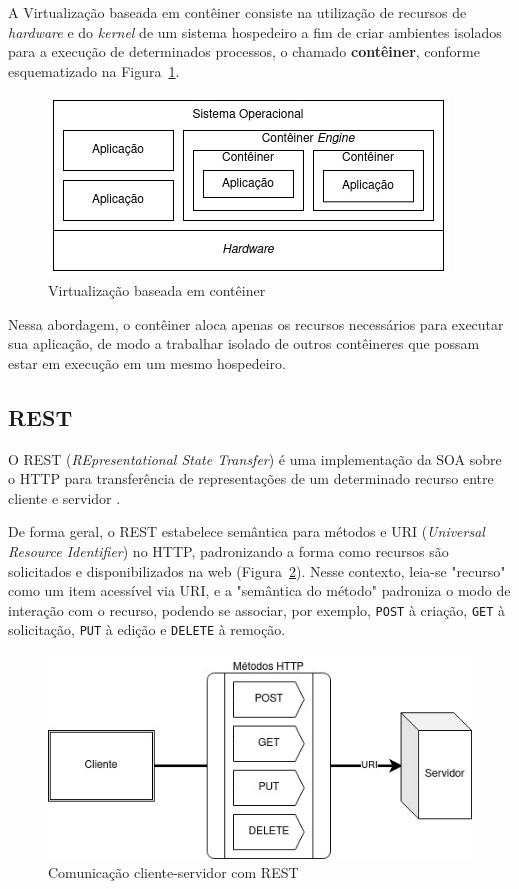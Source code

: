 \documentclass[12pt]{article}
\begin{document}
A Virtualização baseada em contêiner \cite{eder2016} consiste na utilização de recursos de \textit{hardware} e do \textit{kernel} de um sistema hospedeiro a fim de criar ambientes isolados para a execução de determinados processos, o chamado \textbf{contêiner}, conforme esquematizado na Figura~\ref{fig:conteiner}.

\begin{figure}[ht]
	\centering
	\includegraphics[width=.9\textwidth]{conteiner.jpg}
	\caption{Virtualização baseada em contêiner}
	\label{fig:conteiner}
\end{figure} 

Nessa abordagem, o contêiner aloca apenas os recursos necessários para executar sua aplicação, de modo a trabalhar isolado de outros contêineres que possam estar em execução em um mesmo hospedeiro. 

\subsection{REST}

O REST (\textit{REpresentational State Transfer}) é uma implementação da SOA sobre o HTTP para transferência de representações de um determinado recurso entre cliente e servidor \cite{mumbaikar2013}.

De forma geral, o REST estabelece semântica para métodos e URI (\textit{Universal Resource Identifier}) no HTTP, padronizando a forma como recursos são solicitados e disponibilizados na web (Figura~\ref{fig:rest}). Nesse contexto, leia-se "recurso" como um item acessível via URI, e a "semântica do método" padroniza o modo de interação com o recurso, podendo se associar, por exemplo, \texttt{POST} à criação, \texttt{GET} à solicitação, \texttt{PUT} à edição e \texttt{DELETE} à remoção\cite{adamczyk2011}.

\begin{figure}[ht]
	\centering
	\includegraphics[width=.8\textwidth]{rest.jpg}
	\caption{Comunicação cliente-servidor com REST}
	\label{fig:rest}
\end{figure} 
\end{document}
